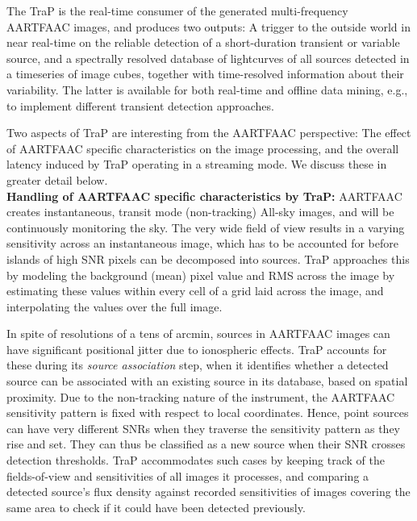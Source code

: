 \documentclass{ws-jai}
\begin{document}
The TraP  is the  real-time consumer of  the generated  multi-frequency AARTFAAC
images,  and produces  two  outputs: A  trigger  to the  outside  world in  near
real-time on  the reliable detection  of a short-duration transient  or variable
source,  and  a spectrally  resolved  database  of  lightcurves of  all  sources
detected in a timeseries of image cubes, together with time-resolved information
about their variability.  The latter is available for both real-time and offline
data mining, e.g., to implement different transient detection approaches.

Two aspects of TraP are interesting from the AARTFAAC perspective: The effect of
AARTFAAC  specific characteristics  on  the image  processing,  and the  overall
latency  induced by  TraP operating  in a  streaming mode.  We discuss  these in
greater detail below.\\

\noindent  \textbf  {Handling of  AARTFAAC  specific  characteristics by  TraP:}
AARTFAAC creates instantaneous, transit  mode (non-tracking) All-sky images, and
will be continuously monitoring the sky. The  very wide field of view results in
a varying sensitivity  across an instantaneous image, which has  to be accounted
for before  islands of  high SNR  pixels can be  decomposed into  sources.  TraP
approaches this by modeling the background (mean) pixel value and RMS across the
image by  estimating these values  within every cell of  a grid laid  across the
image, and interpolating the values over the full image.

In spite of resolutions of a tens of arcmin, sources in AARTFAAC images can have
significant positional  jitter due  to ionospheric  effects.  TraP  accounts for
these during its \textit{source association}  step, when it identifies whether a
detected source can be associated with an existing source in its database, based
on spatial  proximity.  Due to  the non-tracking  nature of the  instrument, the
AARTFAAC sensitivity pattern is fixed  with respect to local coordinates. Hence,
point sources  can have very different  SNRs when they traverse  the sensitivity
pattern as they rise and set.  They can  thus be classified as a new source when
their SNR crosses detection thresholds.  TraP accommodates such cases by keeping
track of  the fields-of-view and sensitivities  of all images it  processes, and
comparing a  detected source's  flux density  against recorded  sensitivities of
images  covering  the  same  area  to  check if  it  could  have  been  detected
previously.
\end{document}
